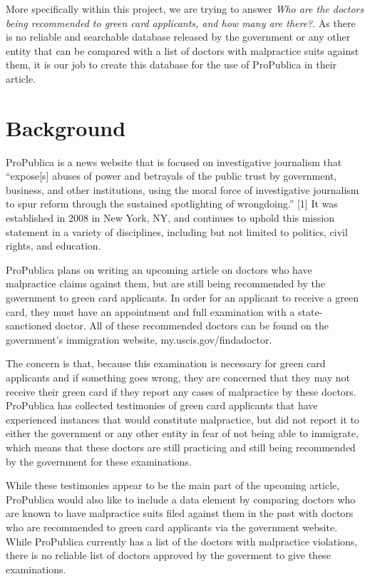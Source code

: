 \documentclass[10pt,letterpaper]{article}
\begin{document}
More specifically within this project, we are trying to answer \emph{Who
are the doctors being recommended to green card applicants, and how many
are there?}. As there is no reliable and searchable database released by
the government or any other entity that can be compared with a list of
doctors with malpractice suits against them, it is our job to create
this database for the use of ProPublica in their article.

\section{Background}\label{background}

ProPublica is a news website that is focused on investigative journalism
that ``expose{[}s{]} abuses of power and betrayals of the public trust
by government, business, and other institutions, using the moral force
of investigative journalism to spur reform through the sustained
spotlighting of wrongdoing.'' {[}1{]} It was established in 2008 in New
York, NY, and continues to uphold this mission statement in a variety of
disciplines, including but not limited to politics, civil rights, and
education.

ProPublica plans on writing an upcoming article on doctors who have
malpractice claims against them, but are still being recommended by the
government to green card applicants. In order for an applicant to
receive a green card, they must have an appointment and full examination
with a state-sanctioned doctor. All of these recommended doctors can be
found on the government's immigration website, my.uscis.gov/findadoctor.

The concern is that, because this examination is necessary for green
card applicants and if something goes wrong, they are concerned that
they may not receive their green card if they report any cases of
malpractice by these doctors. ProPublica has collected testimonies of
green card applicants that have experienced instances that would
constitute malpractice, but did not report it to either the government
or any other entity in fear of not being able to immigrate, which means
that these doctors are still practicing and still being recommended by
the government for these examinations.

While these testimonies appear to be the main part of the upcoming
article, ProPublica would also like to include a data element by
comparing doctors who are known to have malpractice suits filed against
them in the past with doctors who are recommended to green card
applicants via the government website. While ProPublica currently has a
list of the doctors with malpractice violations, there is no reliable
list of doctors approved by the goverment to give these examinations.
\end{document}
